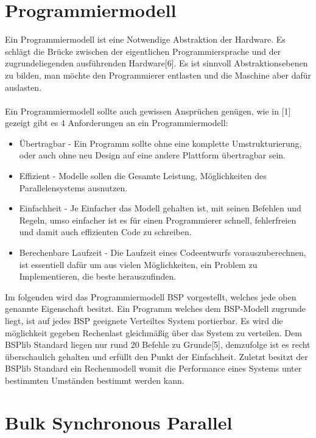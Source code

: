 \documentclass[a4paper,10pt]{scrartcl}
\begin{document}
\section{Programmiermodell}
Ein Programmiermodell ist eine Notwendige Abstraktion der Hardware. Es schlägt die Brücke zwischen der eigentlichen Programmiersprache und der zugrundeliegenden ausführenden Hardware[6]. Es ist sinnvoll Abstraktionsebenen zu bilden, man möchte den Programmierer entlasten und die Maschine aber dafür auslasten.
\\
\\
Ein Programmiermodell sollte auch gewissen Ansprüchen genügen, wie in [1] gezeigt gibt es 4 Anforderungen an ein Programmiermodell:
\begin{itemize}
\item Übertragbar - Ein Programm sollte ohne eine komplette Umstrukturierung, oder auch ohne neu Design auf eine andere Plattform übertragbar sein.
\item Effizient - Modelle sollen die Gesamte Leistung, Möglichkeiten des Parallelensystems ausnutzen.
\item Einfachheit - Je Einfacher das Modell gehalten ist, mit seinen Befehlen und Regeln, umso einfacher ist es für einen Programmierer schnell, fehlerfreien und damit auch effizienten Code zu schreiben.
\item Berechenbare Laufzeit - Die Laufzeit eines Codeentwurfs vorauszuberechnen, ist essentiell dafür um aus vielen Möglichkeiten, ein Problem zu Implementieren, die beste herauszufinden.
\end{itemize}
Im folgenden wird das Programmiermodell BSP vorgestellt, welches jede oben genannte Eigenschaft besitzt. Ein Programm welches dem BSP-Modell zugrunde liegt, ist auf jedes BSP geeignete Verteiltes System portierbar. Es wird die möglichkeit gegeben Rechenlast gleichmäßig über das System zu verteilen. Dem BSPlib Standard liegen nur rund 20 Befehle zu Grunde[5], demzufolge ist es recht überschaulich gehalten und erfüllt den Punkt der Einfachheit. Zuletzt besitzt der BSPlib Standard ein Rechenmodell womit die Performance eines Systems unter bestimmten Umständen bestimmt werden kann.
\newpage
 
\section{Bulk Synchronous Parallel}
\end{document}
